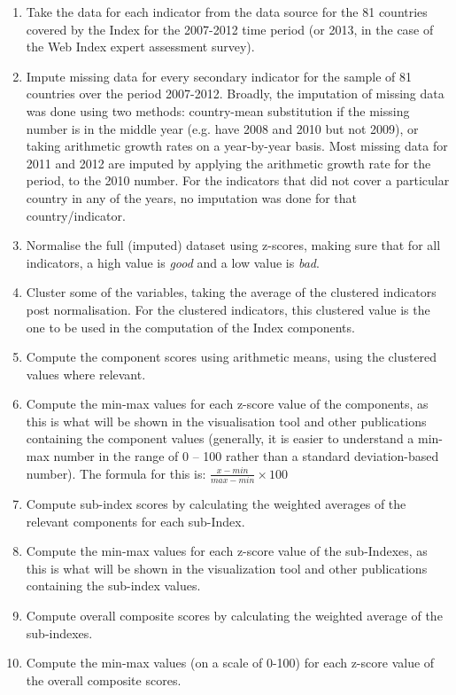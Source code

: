 \documentclass{llncs}
\begin{document}
\begin{enumerate}

\item Take the data for each indicator from the data source for the 81 countries covered by the Index for the 2007-2012 time period (or 2013, in the case of the Web Index expert assessment survey).

\item Impute missing data for every secondary indicator for the sample of 81 countries over the period 2007-2012.  
Broadly, the imputation of missing data was done using two methods: country-mean substitution if the missing number is in the middle year (e.g. have 2008 and 2010 but not 2009), or taking arithmetic growth rates on a year-by-year basis. Most missing data for 2011 and 2012 are imputed by applying the arithmetic growth rate for the period, to the 2010 number. For the indicators that did not cover a particular country in any of the years, no imputation was done for that country/indicator.

\item Normalise the full (imputed) dataset using z-scores, making sure that for all indicators, a high value is \emph{good} and a low value is \emph{bad}.

\item Cluster some of the variables, taking the average of the clustered indicators post normalisation. For the clustered indicators, this clustered value is the one to be used in the computation of the Index components.

\item Compute the component scores using arithmetic means, using the clustered values where relevant.

\item Compute the min-max values for each z-score value of the components, 
 as this is what will be shown in the visualisation tool and other 
 publications containing the component values (generally, it is easier to understand 
 a min-max number in the range of 0 – 100 rather than a standard deviation-based number). 
 The formula for this is: $\frac{x-min}{max-min}\times{}100$

\item Compute sub-index scores by calculating the weighted averages of the relevant components for each sub-Index.

\item Compute the min-max values for each z-score value of the sub-Indexes, as this is what will be shown in the visualization tool and other publications containing the sub-index values.

\item Compute overall composite scores by calculating the weighted average of the sub-indexes.

\item Compute the min-max values (on a scale of 0-100) for each z-score value of the overall composite scores.
\end{enumerate}
\end{document}
